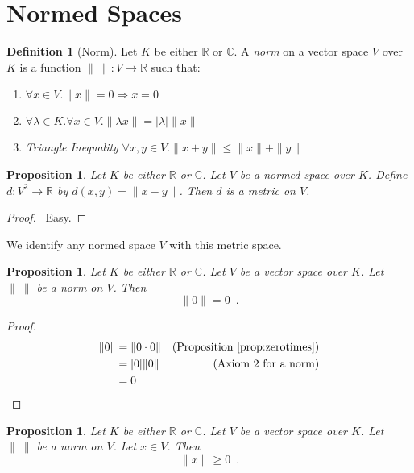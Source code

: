 \documentclass{book}
\let\qed\relax
\newtheorem{prop}[ax]{Proposition}
\theoremstyle{definition}
\newtheorem{df}[ax]{Definition}
\begin{document}
\section{Normed Spaces}

\begin{df}[Norm]
Let $K$ be either $\mathbb{R}$ or $\mathbb{C}$.
A \emph{norm} on a vector space $V$ over $K$ is a function $\| \ \| : V \rightarrow \mathbb{R}$ such that:
\begin{enumerate}
\item $\forall x \in V. \| x \| = 0 \Rightarrow x = 0$
\item $\forall \lambda \in K. \forall x \in V. \| \lambda x \| = |\lambda| \| x \|$
\item \emph{Triangle Inequality} $\forall x,y \in V. \| x + y \| \leq \| x \| + \| y \|$
\end{enumerate}
\end{df}

\begin{prop}
Let $K$ be either $\mathbb{R}$ or $\mathbb{C}$. Let $V$ be a normed space over $K$. Define $d : V^2 \rightarrow \mathbb{R}$ by $d(x,y) = \| x-y \|$. Then $d$ is a metric on $V$.
\end{prop}

\begin{proof}
\pf\ Easy. \qed
\end{proof}

We identify any normed space $V$ with this metric space.

\begin{prop}
\label{prop:normzero}
Let $K$ be either $\mathbb{R}$ or $\mathbb{C}$. Let $V$ be a vector space over $K$. Let $\|\ \|$ be a norm on $V$. Then
\[ \| 0 \| = 0 \enspace . \]
\end{prop}

\begin{proof}
\pf
\begin{align*}
\| 0 \| & = \| 0 \cdot 0 \| & (\text{Proposition \ref{prop:zerotimes}}) \\
& = |0| \| 0 \| & (\text{Axiom 2 for a norm}) \\
& = 0 & \qed
\end{align*}
\end{proof}

\begin{prop}
Let $K$ be either $\mathbb{R}$ or $\mathbb{C}$. Let $V$ be a vector space over $K$. Let $\|\ \|$ be a norm on $V$. Let $x \in V$. Then
\[ \| x \| \geq 0 \enspace . \]
\end{prop}
\end{document}
